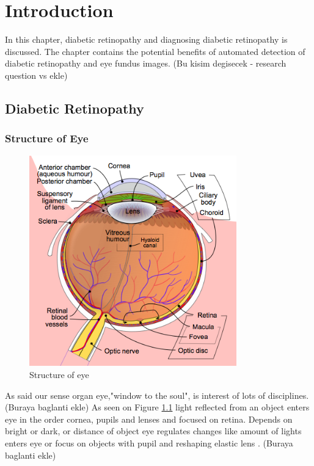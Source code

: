 \chapter{Introduction}
\label{intro}

In this chapter, diabetic retinopathy and diagnosing diabetic retinopathy is discussed. The chapter contains the potential benefits of automated detection of diabetic retinopathy and eye fundus images.  (Bu kisim degisecek - research question vs ekle)

\section{Diabetic Retinopathy}


\subsection{Structure of Eye}

\begin{figure}[t]
\caption{Structure of eye \citep{WikipediaEN:AFM}}
\label{structureOfEye}
\centering
\includegraphics[width=0.8\textwidth]{Figures/structure_of_eye}
\end{figure}

As \citet{hughes2004anatomy} said our sense organ eye,"window to the soul", is interest of lots of disciplines. (Buraya baglanti ekle) As seen on Figure \ref{structureOfEye} light reflected from an object enters eye in the order cornea, pupils and lenses \citep{falt2012modern} and focused on retina. Depends on bright or dark, or distance of object eye regulates changes like amount of lights enters eye or focus on objects with pupil and reshaping elastic lens \citep{kauppi2010eye}. (Buraya baglanti ekle)

